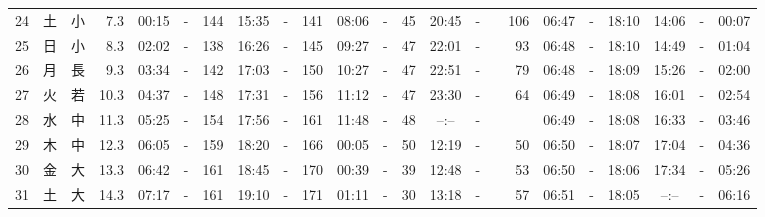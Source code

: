 \documentclass[12pt,a4j]{jsarticle}
\begin{document}
\begin{table}[htbp]
\begin{center}
{\begin{tabular}{|rc|cr|ccrccr|ccrccr|ccc|ccc|}
24 & 土 & 小 &  7.3 &  00:15 &-& 144 &  15:35 &-& 141 &  08:06 &-&  45 &  20:45 &-& 106 & 06:47 & -& 18:10 & 14:06 & -& 00:07 \\
25 & 日 & 小 &  8.3 &  02:02 &-& 138 &  16:26 &-& 145 &  09:27 &-&  47 &  22:01 &-&  93 & 06:48 & -& 18:10 & 14:49 & -& 01:04 \\
26 & 月 & 長 &  9.3 &  03:34 &-& 142 &  17:03 &-& 150 &  10:27 &-&  47 &  22:51 &-&  79 & 06:48 & -& 18:09 & 15:26 & -& 02:00 \\
27 & 火 & 若 & 10.3 &  04:37 &-& 148 &  17:31 &-& 156 &  11:12 &-&  47 &  23:30 &-&  64 & 06:49 & -& 18:08 & 16:01 & -& 02:54 \\
28 & 水 & 中 & 11.3 &  05:25 &-& 154 &  17:56 &-& 161 &  11:48 &-&  48 &  --:-- &-&~~~~~ & 06:49 & -& 18:08 & 16:33 & -& 03:46 \\
29 & 木 & 中 & 12.3 &  06:05 &-& 159 &  18:20 &-& 166 &  00:05 &-&  50 &  12:19 &-&  50 & 06:50 & -& 18:07 & 17:04 & -& 04:36 \\
30 & 金 & 大 & 13.3 &  06:42 &-& 161 &  18:45 &-& 170 &  00:39 &-&  39 &  12:48 &-&  53 & 06:50 & -& 18:06 & 17:34 & -& 05:26 \\
31 & 土 & 大 & 14.3 &  07:17 &-& 161 &  19:10 &-& 171 &  01:11 &-&  30 &  13:18 &-&  57 & 06:51 & -& 18:05 & --:-- & -& 06:16 \\
   \hline
   \end{tabular}}
   \end{center}
\end{table}
\newpage
\end{document}
